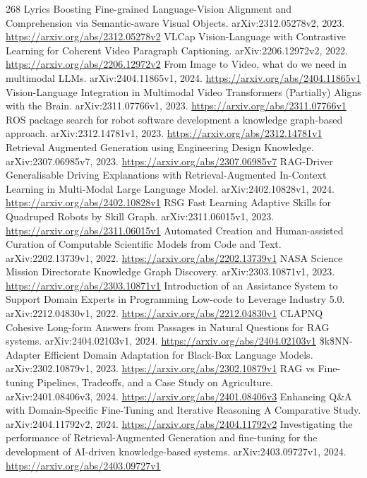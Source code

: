 \documentclass[11pt]{article}
\begin{document}
\begin{thebibliography}{268}
 Lyrics Boosting Fine-grained Language-Vision Alignment and Comprehension via Semantic-aware Visual Objects. arXiv:2312.05278v2, 2023. \url{https://arxiv.org/abs/2312.05278v2}
 VLCap Vision-Language with Contrastive Learning for Coherent Video Paragraph Captioning. arXiv:2206.12972v2, 2022. \url{https://arxiv.org/abs/2206.12972v2}
 From Image to Video, what do we need in multimodal LLMs. arXiv:2404.11865v1, 2024. \url{https://arxiv.org/abs/2404.11865v1}
 Vision-Language Integration in Multimodal Video Transformers (Partially) Aligns with the Brain. arXiv:2311.07766v1, 2023. \url{https://arxiv.org/abs/2311.07766v1}
 ROS package search for robot software development a knowledge graph-based approach. arXiv:2312.14781v1, 2023. \url{https://arxiv.org/abs/2312.14781v1}
 Retrieval Augmented Generation using Engineering Design Knowledge. arXiv:2307.06985v7, 2023. \url{https://arxiv.org/abs/2307.06985v7}
 RAG-Driver Generalisable Driving Explanations with Retrieval-Augmented In-Context Learning in Multi-Modal Large Language Model. arXiv:2402.10828v1, 2024. \url{https://arxiv.org/abs/2402.10828v1}
 RSG Fast Learning Adaptive Skills for Quadruped Robots by Skill Graph. arXiv:2311.06015v1, 2023. \url{https://arxiv.org/abs/2311.06015v1}
 Automated Creation and Human-assisted Curation of Computable Scientific Models from Code and Text. arXiv:2202.13739v1, 2022. \url{https://arxiv.org/abs/2202.13739v1}
 NASA Science Mission Directorate Knowledge Graph Discovery. arXiv:2303.10871v1, 2023. \url{https://arxiv.org/abs/2303.10871v1}
 Introduction of an Assistance System to Support Domain Experts in Programming Low-code to Leverage Industry 5.0. arXiv:2212.04830v1, 2022. \url{https://arxiv.org/abs/2212.04830v1}
 CLAPNQ Cohesive Long-form Answers from Passages in Natural Questions for RAG systems. arXiv:2404.02103v1, 2024. \url{https://arxiv.org/abs/2404.02103v1}
 \$k\$NN-Adapter Efficient Domain Adaptation for Black-Box Language Models. arXiv:2302.10879v1, 2023. \url{https://arxiv.org/abs/2302.10879v1}
 RAG vs Fine-tuning Pipelines, Tradeoffs, and a Case Study on Agriculture. arXiv:2401.08406v3, 2024. \url{https://arxiv.org/abs/2401.08406v3}
 Enhancing Q\&A with Domain-Specific Fine-Tuning and Iterative Reasoning A Comparative Study. arXiv:2404.11792v2, 2024. \url{https://arxiv.org/abs/2404.11792v2}
 Investigating the performance of Retrieval-Augmented Generation and fine-tuning for the development of AI-driven knowledge-based systems. arXiv:2403.09727v1, 2024. \url{https://arxiv.org/abs/2403.09727v1}

\end{thebibliography}
\end{document}
